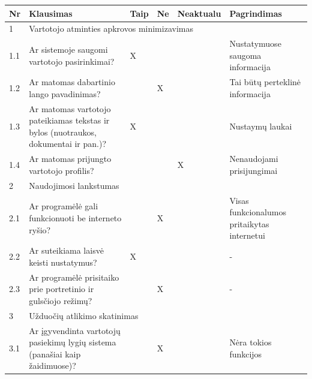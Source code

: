 \documentclass{VUMIFPSkursinis}
\begin{document}
\begin{longtable}[c]{|p{1cm}|p{4cm}|p{1cm}|p{1cm}|p{1.6cm}|p{4cm}|}
\hline
Nr    & Klausimas                                                                                            & Taip & Ne & Neaktualu & Pagrindimas \\ \hline
\endfirsthead
%
\endhead
%
1     & \multicolumn{5}{l|}{Vartotojo atminties apkrovos minimizavimas}                                                                            \\ \hline
1.1   & Ar sistemoje saugomi vartotojo pasirinkimai?                                                         &  X  &     &           &   Nustatymuose saugoma informacija  \\ \hline
1.2   & Ar matomas dabartinio lango pavadinimas?                                                             &     &  X  &           &   Tai būtų perteklinė informacija  \\ \hline
1.3   & Ar matomas vartotojo pateikiamas tekstas ir bylos (nuotraukos, dokumentai ir pan.)?                  &  X  &     &           &   Nustaymų laukai  \\ \hline
1.4   & Ar matomas prijungto vartotojo profilis?                                                             &     &     &     X     &   Nenaudojami prisijungimai  \\ \hline
2     & \multicolumn{5}{l|}{Naudojimosi lankstumas}                                                                                                \\ \hline
2.1   & Ar programėlė gali funkcionuoti be interneto ryšio?                                                  &     &  X  &           &   Visas funkcionalumos pritaikytas internetui \\ \hline
2.2   & Ar suteikiama laisvė keisti nustatymus?                                                              &  X  &     &           &   -          \\ \hline
2.3   & Ar programėlė prisitaiko prie portretinio ir gulsčiojo režimų?                                       &     &  X  &           &   -         \\ \hline
3     & \multicolumn{5}{l|}{Užduočių atlikimo skatinimas}                                                                                          \\ \hline
3.1   & Ar įgyvendinta vartotojų pasiekimų lygių sistema (panašiai kaip žaidimuose)?                         &     &  X  &           &   Nėra tokios funkcijos          \\ \hline

\end{longtable}
\end{document}
